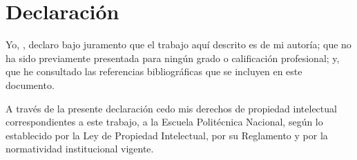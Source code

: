 \chapter*{Declaración}

Yo, \theauthor, declaro bajo juramento que el trabajo aquí descrito es de mi
autoría; que no ha sido previamente presentada para ningún grado o calificación
profesional; y, que he consultado las referencias bibliográficas que se incluyen
en este documento.

A través de la presente declaración cedo mis derechos de propiedad intelectual
correspondientes a este trabajo, a la Escuela Politécnica Nacional, según lo
establecido por la Ley de Propiedad Intelectual, por su Reglamento y por la
normatividad institucional vigente.

\vspace{1.5cm}

\makebox[5cm]{\hrulefill} \\
\textbf{\theauthor}
